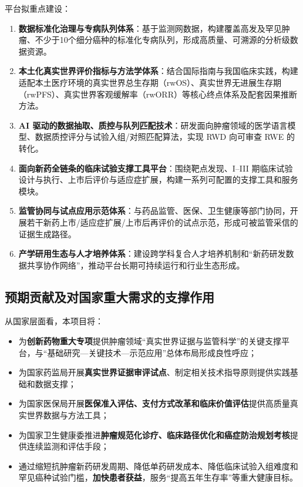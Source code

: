 \documentclass[12pt, a4paper, fontset=mac]{ctexart} %
\begin{document}
\vspace{0.5em}
平台拟重点建设：

\begin{enumerate}[label=(\arabic*)]
  \item \textbf{数据标准化治理与专病队列体系}：基于监测网数据，构建覆盖高发及罕见肿瘤、不少于10个细分癌种的标准化专病队列，形成高质量、可溯源的分析级数据资源。
\item \textbf{本土化真实世界评价指标与方法学体系}：结合国际指南与我国临床实践，构建适配本土医疗环境的真实世界总生存期（rwOS）、真实世界无进展生存期（rwPFS）、真实世界客观缓解率（rwORR）等核心终点体系及配套因果推断方法。
  \item \textbf{AI 驱动的数据抽取、质控与队列匹配技术}：研发面向肿瘤领域的医学语言模型、数据质控评分与试验入组/对照匹配算法，实现 RWD 向可审查 RWE 的转化。
  \item \textbf{面向新药全链条的临床试验支撑工具平台}：围绕靶点发现、I--III 期临床试验设计与执行、上市后评价与适应症扩展，构建一系列可配置的支撑工具和服务模块。
  \item \textbf{监管协同与试点应用示范体系}：与药品监管、医保、卫生健康等部门协同，开展若干新药上市/适应症扩展/上市后再评价的试点示范，形成可被监管采信的证据生成路径。
  \item \textbf{产学研用生态与人才培养体系}：建设跨学科复合人才培养机制和“新药研发数据共享协作网络”，推动平台长期可持续运行和行业生态形成。
\end{enumerate}

\subsection{预期贡献及对国家重大需求的支撑作用}

从国家层面看，本项目将：

\begin{itemize}
  \item 为\textbf{创新药物重大专项}提供肿瘤领域“真实世界证据与监管科学”的关键支撑平台，与“基础研究—关键技术—示范应用”总体布局形成良性呼应；
  \item 为国家药监局开展\textbf{真实世界证据审评试点}、制定相关技术指导原则提供实践基础和数据支撑；
  \item 为国家医保局开展\textbf{医保准入评估、支付方式改革和临床价值评估}提供高质量真实世界数据与方法工具；
  \item 为国家卫生健康委推进\textbf{肿瘤规范化诊疗、临床路径优化和癌症防治规划考核}提供连续监测和评估手段；
  \item 通过缩短抗肿瘤新药研发周期、降低单药研发成本、降低临床试验入组难度和罕见癌种试验门槛，\textbf{加快患者获益}，服务“提高五年生存率”等重大健康目标。
\end{itemize}
\end{document}
